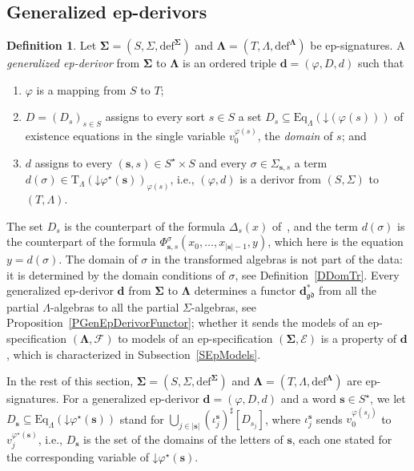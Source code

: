 \documentclass{amsart}
\newcommand{\bb}[1]{\ensuremath{\lvert #1 \rvert}}
\newcommand{\vs}[1]{\mathbin{\downarrow}#1}
\theoremstyle{plain}
\theoremstyle{definition}
\newtheorem{definition}[theorem]{Definition}
\begin{document}
\subsection{Generalized ep-derivors}\label{SGenEpDerivorsDef}

\begin{definition}\label{DGenEpDerivor}
Let $\mathbf{\Sigma}=(S,\Sigma,\mathrm{def}^{\mathbf{\Sigma}})$ and $\mathbf{\Lambda}=(T,\Lambda,\mathrm{def}^{\mathbf{\Lambda}})$ be ep-signatures. A \emph{generalized ep-derivor} from $\mathbf{\Sigma}$ to $\mathbf{\Lambda}$ is an ordered triple $\mathbf{d}=(\varphi,D,d)$ such that
\begin{enumerate}
\item $\varphi$ is a mapping from $S$ to $T$;
\item $D=(D_{s})_{s\in S}$ assigns to every sort $s\in S$ a set $D_{s}\subseteq\mathrm{Eq}_{\Lambda}(\vs{(\varphi(s))})$ of existence equations in the single variable $v^{\varphi(s)}_{0}$, the \emph{domain} of $s$; and
\item $d$ assigns to every $(\mathbf{s},s)\in S^{\star}\times S$ and every $\sigma\in\Sigma_{\mathbf{s},s}$ a term $d(\sigma)\in\mathrm{T}_{\Lambda}(\vs{\varphi^{\star}(\mathbf{s})})_{\varphi(s)}$, i.e., $(\varphi,d)$ is a derivor from $(S,\Sigma)$ to $(T,\Lambda)$.
\end{enumerate}
\end{definition}

The set $D_{s}$ is the counterpart of the formula $\Delta_{s}(x)$ of~\cite{LG18}, and the term $d(\sigma)$ is the counterpart of the formula $\Phi^{\sigma}_{\mathbf{s},s}(x_{0},\ldots,x_{\bb{\mathbf{s}}-1},y)$, which here is the equation $y=d(\sigma)$. The domain of $\sigma$ in the transformed algebras is not part of the data: it is determined by the domain conditions of $\sigma$, see Definition~\ref{DDomTr}. Every generalized ep-derivor $\mathbf{d}$ from $\mathbf{\Sigma}$ to $\mathbf{\Lambda}$ determines a functor $\mathbf{d}^{\ast}_{\mathfrak{gd}}$ from all the partial $\Lambda$-algebras to all the partial $\Sigma$-algebras, see Proposition~\ref{PGenEpDerivorFunctor}; whether it sends the models of an ep-specification $(\mathbf{\Lambda},\mathcal{F})$ to models of an ep-specification $(\mathbf{\Sigma},\mathcal{E})$ is a property of $\mathbf{d}$, which is characterized in Subsection~\ref{SEpModels}.

In the rest of this section, $\mathbf{\Sigma}=(S,\Sigma,\mathrm{def}^{\mathbf{\Sigma}})$ and $\mathbf{\Lambda}=(T,\Lambda,\mathrm{def}^{\mathbf{\Lambda}})$ are ep-signatures. For a generalized ep-derivor $\mathbf{d}=(\varphi,D,d)$ and a word $\mathbf{s}\in S^{\star}$, we let $D_{\mathbf{s}}\subseteq\mathrm{Eq}_{\Lambda}(\vs{\varphi^{\star}(\mathbf{s})})$ stand for $\bigcup_{j\in\bb{\mathbf{s}}}(\iota^{\mathbf{s}}_{j})^{\sharp}[D_{s_{j}}]$, where $\iota^{\mathbf{s}}_{j}$ sends $v^{\varphi(s_{j})}_{0}$ to $v^{\varphi^{\star}(\mathbf{s})}_{j}$, i.e., $D_{\mathbf{s}}$ is the set of the domains of the letters of $\mathbf{s}$, each one stated for the corresponding variable of $\vs{\varphi^{\star}(\mathbf{s})}$.
\end{document}
